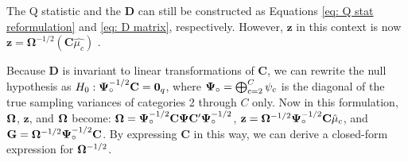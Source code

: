 The Q statistic and the $\mathbf{D}$ can still be constructed as Equations \ref{eq: Q stat reformulation} and \ref{eq: D matrix}, respectively. However, $\mathbf{z}$ in this context is now $\mathbf{z} = \mathbf{\Omega}^{-1/2}(\mathbf{C}\hat{\mu_c})$ \autocite{pustejovsky_wald_2025}.







Because $\bm{D}$ is invariant to linear transformations of $\bm{C}$, we can rewrite the null hypothesis as $H_0: \boldsymbol\Psi_{\circ}^{-1/2} \mathbf{C} = \mathbf{0}_q$, where $\boldsymbol\Psi_{\circ} = \bigoplus_{c=2}^C \psi_c$ is the diagonal of the true sampling variances of categories 2 through $C$ only. Now in this formulation, $\boldsymbol\Omega$, $\bm{z}$, and $\boldsymbol\Omega$ become: $\boldsymbol\Omega = \boldsymbol\Psi_{\circ}^{-1/2} \mathbf{C} \boldsymbol\Psi \mathbf{C}'\boldsymbol\Psi_{\circ}^{-1/2}$, $\mathbf{z} = \boldsymbol\Omega^{-1/2}\boldsymbol\Psi_{\circ}^{-1/2}\mathbf{C}\hat\mu_c$, and $\mathbf{G} = \boldsymbol\Omega^{-1/2} \boldsymbol\Psi_{\circ}^{-1/2} \mathbf{C}$. By expressing $\bm{C}$ in this way, we can derive a closed-form expression for $\boldsymbol\Omega^{-1/2}$.

